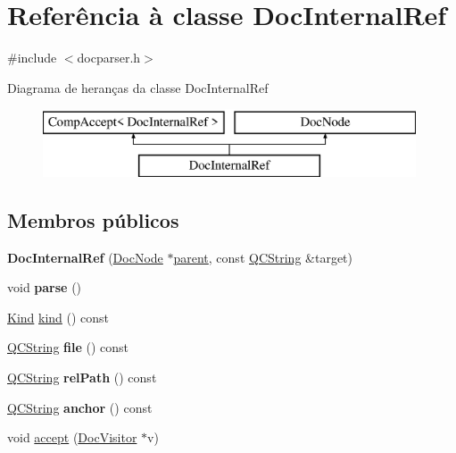 \hypertarget{class_doc_internal_ref}{\section{Referência à classe Doc\-Internal\-Ref}
\label{class_doc_internal_ref}
}


{\ttfamily \#include $<$docparser.\-h$>$}

Diagrama de heranças da classe Doc\-Internal\-Ref\begin{figure}[H]
\begin{center}
\leavevmode
\includegraphics[height=2.000000cm]{class_doc_internal_ref}
\end{center}
\end{figure}
\subsection*{Membros públicos}
\begin{DoxyCompactItemize}
\item 
\hypertarget{class_doc_internal_ref_a9785f8769202b673a742119ac40adc5e}{{\bfseries Doc\-Internal\-Ref} (\hyperlink{class_doc_node}{Doc\-Node} $\ast$\hyperlink{class_doc_node_abd7f070d6b0a38b4da71c2806578d19d}{parent}, const \hyperlink{class_q_c_string}{Q\-C\-String} \&target)}\label{class_doc_internal_ref_a9785f8769202b673a742119ac40adc5e}

\item 
\hypertarget{class_doc_internal_ref_ad7c704b34912678d95c13243cacf9d7f}{void {\bfseries parse} ()}\label{class_doc_internal_ref_ad7c704b34912678d95c13243cacf9d7f}

\item 
\hyperlink{class_doc_node_aa10c9e8951b8ccf714a59ec321bdac5b}{Kind} \hyperlink{class_doc_internal_ref_aa9d037bed9f9a083d0cd01485637d843}{kind} () const 
\item 
\hypertarget{class_doc_internal_ref_aeaa8cdb0fbabc1058b7d3813f2fd223b}{\hyperlink{class_q_c_string}{Q\-C\-String} {\bfseries file} () const }\label{class_doc_internal_ref_aeaa8cdb0fbabc1058b7d3813f2fd223b}

\item 
\hypertarget{class_doc_internal_ref_a3aa6799d4713d51d9cc4862af165671c}{\hyperlink{class_q_c_string}{Q\-C\-String} {\bfseries rel\-Path} () const }\label{class_doc_internal_ref_a3aa6799d4713d51d9cc4862af165671c}

\item 
\hypertarget{class_doc_internal_ref_acd17ae1d9600f864b1beb85dfb99a4f4}{\hyperlink{class_q_c_string}{Q\-C\-String} {\bfseries anchor} () const }\label{class_doc_internal_ref_acd17ae1d9600f864b1beb85dfb99a4f4}

\item 
void \hyperlink{class_doc_internal_ref_a7ba716e854ae2f8f87a4eb2140e302b6}{accept} (\hyperlink{class_doc_visitor}{Doc\-Visitor} $\ast$v)
\end{DoxyCompactItemize}
